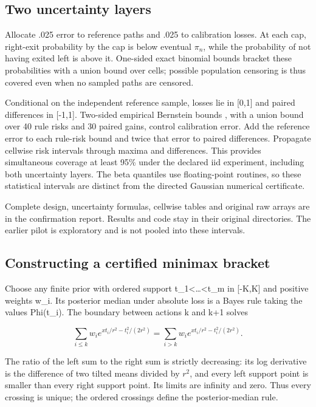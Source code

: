 \subsection{Two uncertainty layers}\label{two-uncertainty-layers}

Allocate .025 error to reference paths and .025 to calibration losses. At each cap, right-exit probability by the cap is below eventual \(\pi_n\), while the probability of not having exited left is above it. One-sided exact binomial bounds bracket these probabilities with a union bound over cells; possible population censoring is thus covered even when no sampled paths are censored.

Conditional on the independent reference sample, losses lie in {[}0,1{]} and paired differences in {[}-1,1{]}. Two-sided empirical Bernstein bounds \cite{maurer2009}, with a union bound over 40 rule risks and 30 paired gains, control calibration error. Add the reference error to each rule-risk bound and twice that error to paired differences. Propagate cellwise risk intervals through maxima and differences. This provides simultaneous coverage at least 95\% under the declared iid experiment, including both uncertainty layers. The beta quantiles use floating-point routines, so these statistical intervals are distinct from the directed Gaussian numerical certificate.

Complete design, uncertainty formulas, cellwise tables and original raw arrays are in the confirmation report. Results and code stay in their original directories. The earlier pilot is exploratory and is not pooled into these intervals.

\subsection{Constructing a certified minimax bracket}\label{constructing-a-certified-minimax-bracket}

Choose any finite prior with ordered support t\_1\textless\ldots\textless t\_m in {[}-K,K{]} and positive weights w\_i. Its posterior median under absolute loss is a Bayes rule taking the values Phi(t\_i). The boundary between actions k and k+1 solves

\[
\sum_{i\le k}w_i e^{x t_i/r^2-t_i^2/(2r^2)}
=\sum_{i>k}w_i e^{x t_i/r^2-t_i^2/(2r^2)}.
\tag{G.8}
\]

The ratio of the left sum to the right sum is strictly decreasing: its log derivative is the difference of two tilted means divided by \(r^2\), and every left support point is smaller than every right support point. Its limits are infinity and zero. Thus every crossing is unique; the ordered crossings define the posterior-median rule.


